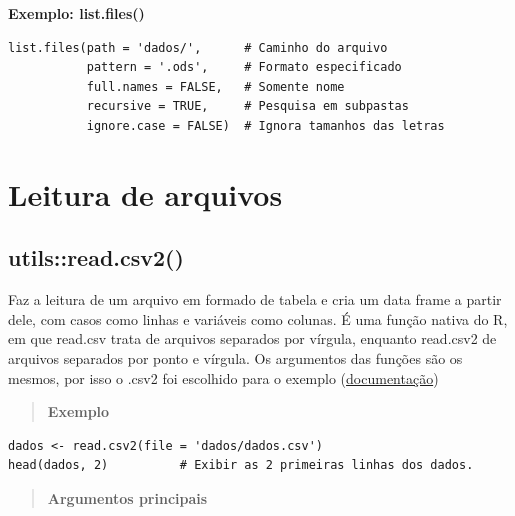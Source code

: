 \documentclass[
]{book}
\theoremstyle{definition}
\theoremstyle{definition}
\theoremstyle{definition}
\theoremstyle{definition}
\theoremstyle{remark}
\begin{document}
\textbf{Exemplo: list.files()}

\begin{verbatim}
list.files(path = 'dados/',      # Caminho do arquivo
           pattern = '.ods',     # Formato especificado
           full.names = FALSE,   # Somente nome
           recursive = TRUE,     # Pesquisa em subpastas
           ignore.case = FALSE)  # Ignora tamanhos das letras
\end{verbatim}

\hypertarget{leitura-de-arquivos}{%
\section{Leitura de arquivos}\label{leitura-de-arquivos}}

\hypertarget{utilsread.csv2}{%
\subsection{utils::read.csv2()}\label{utilsread.csv2}}

Faz a leitura de um arquivo em formado de tabela e cria um data frame a partir dele, com casos como linhas e variáveis como colunas. É uma função nativa do R, em que read.csv trata de arquivos separados por vírgula, enquanto read.csv2 de arquivos separados por ponto e vírgula. Os argumentos das funções são os mesmos, por isso o .csv2 foi escolhido para o exemplo (\href{https://www.rdocumentation.org/packages/utils/versions/3.6.2/topics/read.table}{documentação})

\begin{quote}
\textbf{Exemplo}
\end{quote}

\begin{verbatim}
dados <- read.csv2(file = 'dados/dados.csv')
head(dados, 2)          # Exibir as 2 primeiras linhas dos dados.
\end{verbatim}

\begin{quote}
\textbf{Argumentos principais}
\end{quote}
\end{document}
